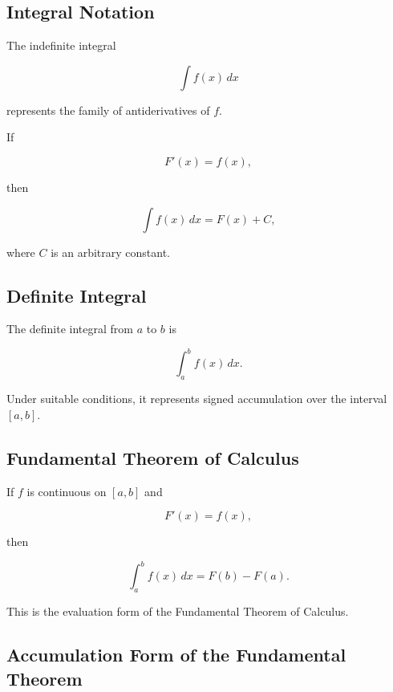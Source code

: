 \subsection{Integral Notation}
\label{subsec:integral-notation-reference}

The indefinite integral

\[
\boxed{
\int f(x)\,dx
}
\]

represents the family of antiderivatives of \(f\).

If

\[
F'(x)=f(x),
\]

then

\[
\boxed{
\int f(x)\,dx
=
F(x)+C,
}
\]

where \(C\) is an arbitrary constant.

\subsection{Definite Integral}
\label{subsec:definite-integral-reference}

The definite integral from \(a\) to \(b\) is

\[
\boxed{
\int_a^b f(x)\,dx.
}
\]

Under suitable conditions, it represents signed accumulation over the
interval \([a,b]\).

\subsection{Fundamental Theorem of Calculus}
\label{subsec:ftc-integral-reference}

If \(f\) is continuous on \([a,b]\) and

\[
F'(x)=f(x),
\]

then

\[
\boxed{
\int_a^b f(x)\,dx
=
F(b)-F(a).
}
\]

This is the evaluation form of the Fundamental Theorem of Calculus.

\subsection{Accumulation Form of the Fundamental Theorem}
\label{subsec:ftc-accumulation-reference}

